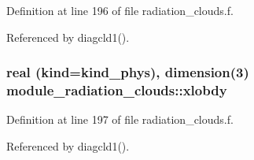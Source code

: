Definition at line 196 of file radiation\+\_\+clouds.\+f.



Referenced by diagcld1().

\subsubsection[{\texorpdfstring{xlobdy}{xlobdy}}]{\setlength{\rightskip}{0pt plus 5cm}real (kind=kind\+\_\+phys), dimension(3) module\+\_\+radiation\+\_\+clouds\+::xlobdy\hspace{0.3cm}{\ttfamily [private]}}\hypertarget{namespacemodule__radiation__clouds_aab28f783919380e5ff7f925f70355a57}{}\label{namespacemodule__radiation__clouds_aab28f783919380e5ff7f925f70355a57}


Definition at line 197 of file radiation\+\_\+clouds.\+f.



Referenced by diagcld1().

